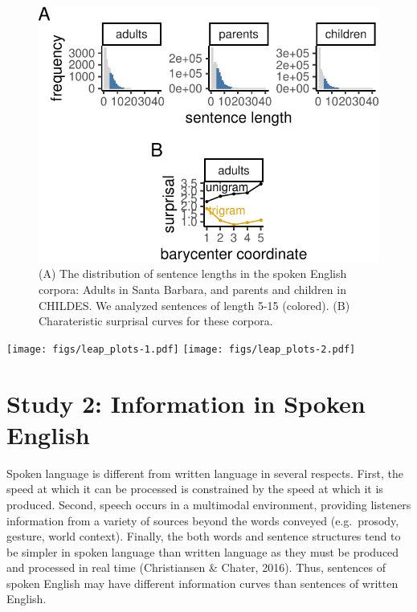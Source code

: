 \documentclass[
  english,
  man,floatsintext]{apa6}
\begin{document}
\begin{figure}[tb]

{\centering \includegraphics{figs/spoken-figs-1} 

}

\caption{(A) The distribution of sentence lengths in the spoken English corpora: Adults in Santa Barbara, and parents and children in CHILDES. We analyzed sentences of length 5-15 (colored). (B) Charateristic surprisal curves for these corpora.}\label{fig:spoken-figs}
\end{figure}

\texttt{[image: figs/leap\_plots-1.pdf]} \texttt{[image: figs/leap\_plots-2.pdf]}

\hypertarget{study-2-information-in-spoken-english}{%
\section{Study 2: Information in Spoken English}\label{study-2-information-in-spoken-english}}

Spoken language is different from written language in several respects. First, the speed at which it can be processed is constrained by the speed at which it is produced. Second, speech occurs in a multimodal environment, providing listeners information from a variety of sources beyond the words conveyed (e.g.~prosody, gesture, world context). Finally, the both words and sentence structures tend to be simpler in spoken language than written language as they must be produced and processed in real time (Christiansen \& Chater, 2016). Thus, sentences of spoken English may have different information curves than sentences of written English.
\end{document}

